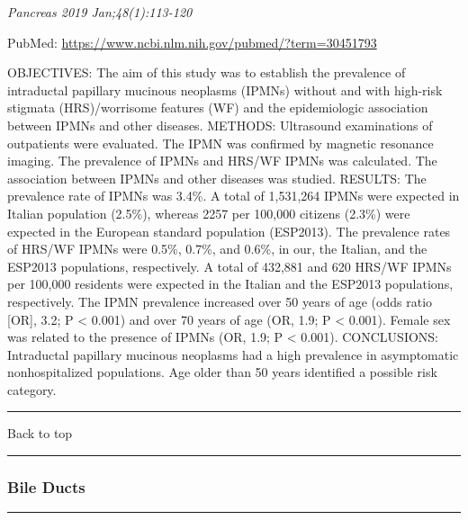 \documentclass[]{article}
\begin{document}
\emph{Pancreas 2019 Jan;48(1):113-120}

PubMed: \url{https://www.ncbi.nlm.nih.gov/pubmed/?term=30451793}

OBJECTIVES: The aim of this study was to establish the prevalence of
intraductal papillary mucinous neoplasms (IPMNs) without and with
high-risk stigmata (HRS)/worrisome features (WF) and the epidemiologic
association between IPMNs and other diseases. METHODS: Ultrasound
examinations of outpatients were evaluated. The IPMN was confirmed by
magnetic resonance imaging. The prevalence of IPMNs and HRS/WF IPMNs was
calculated. The association between IPMNs and other diseases was
studied. RESULTS: The prevalence rate of IPMNs was 3.4\%. A total of
1,531,264 IPMNs were expected in Italian population (2.5\%), whereas
2257 per 100,000 citizens (2.3\%) were expected in the European standard
population (ESP2013). The prevalence rates of HRS/WF IPMNs were 0.5\%,
0.7\%, and 0.6\%, in our, the Italian, and the ESP2013 populations,
respectively. A total of 432,881 and 620 HRS/WF IPMNs per 100,000
residents were expected in the Italian and the ESP2013 populations,
respectively. The IPMN prevalence increased over 50 years of age (odds
ratio {[}OR{]}, 3.2; P \textless{} 0.001) and over 70 years of age (OR,
1.9; P \textless{} 0.001). Female sex was related to the presence of
IPMNs (OR, 1.9; P \textless{} 0.001). CONCLUSIONS: Intraductal papillary
mucinous neoplasms had a high prevalence in asymptomatic nonhospitalized
populations. Age older than 50 years identified a possible risk
category.

{}

{}

\begin{center}\rule{0.5\linewidth}{\linethickness}\end{center}

Back to top

\begin{center}\rule{0.5\linewidth}{\linethickness}\end{center}

\pagebreak

\hypertarget{bile-ducts}{%
\subsubsection{Bile Ducts}\label{bile-ducts}}

\begin{center}\rule{0.5\linewidth}{\linethickness}\end{center}
\end{document}

